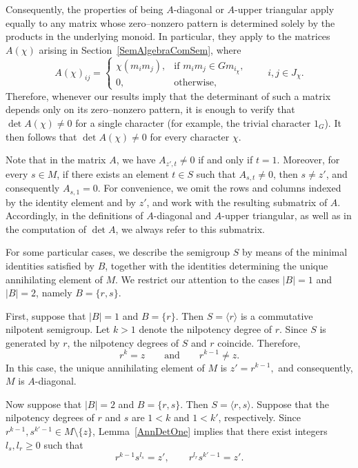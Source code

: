 \documentclass[11pt,reqno]{amsart}
\theoremstyle{plain}
\theoremstyle{remark}
\theoremstyle{definition}
\begin{document}
Consequently, the properties of being $A$-diagonal or $A$-upper triangular apply equally to any matrix whose zero--nonzero pattern is determined solely by the products in the underlying monoid. In particular, they apply to the matrices $A(\chi)$ arising in Section~\ref{SemAlgebraComSem}, where
\[
A(\chi)_{ij}=
\begin{cases}
\chi(m_im_j), & \text{if } m_im_j\in Gm_{i_\chi},\\
0, & \text{otherwise},
\end{cases}
\qquad i,j\in J_\chi.
\]
Therefore, whenever our results imply that the determinant of such a matrix depends only on its zero--nonzero pattern, it is enough to verify that $\det A(\chi)\neq0$ for a single character (for example, the trivial character $1_G$). It then follows that $\det A(\chi)\neq0$ for every character $\chi$.

Note that in the matrix $A$, we have
\(A_{z',t}\neq 0\)
if and only if
\(t=1\). 
Moreover, for every $s \in M$, if there exists an element $t \in S$ such that $A_{s,t}\neq 0$, then $s\neq z'$, and consequently
\(A_{s,1}=0\).
For convenience, we omit the rows and columns indexed by the identity element and by $z'$, and work with the resulting submatrix of $A$. Accordingly, in the definitions of $A$-diagonal and $A$-upper triangular, as well as in the computation of $\det A$, we always refer to this submatrix.

For some particular cases, we describe the semigroup $S$ by means of the minimal identities satisfied by $B$, together with the identities determining the unique annihilating element of $M$. We restrict our attention to the cases $|B|=1$ and $|B|=2$, namely $B = \{r,s\}$.

First, suppose that $|B| = 1$ and $B = \{r\}$. Then
\(
S = \langle r \rangle
\)
is a commutative nilpotent semigroup. Let $k>1$ denote the nilpotency degree of $r$. Since $S$ is generated by $r$, the nilpotency degrees of $S$ and $r$ coincide. Therefore,
\[
r^k = z
\qquad \text{and} \qquad
r^{k-1} \neq z.
\]
In this case, the unique annihilating element of $M$ is
\(
z' = r^{k-1},
\)
and consequently, $M$ is $A$-diagonal.

Now suppose that $|B| = 2$ and $B = \{r,s\}$. 
Then $S = \langle r,s \rangle$. 
Suppose that the nilpotency degrees of $r$ and $s$ are $1<k$ and $1<k'$, respectively.
Since $r^{k-1}, s^{k'-1} \in M \setminus \{z\}$, Lemma~\ref{AnnDetOne} implies that there exist integers $l_s, l_r \geq 0$ such that
\[
r^{k-1}s^{l_s} = z', \qquad r^{l_r}s^{k'-1} = z'.
\]
\end{document}

